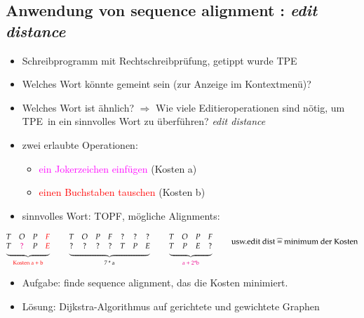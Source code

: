     \subsection*{Anwendung von sequence alignment : \emph{edit distance}}
    \begin{itemize}
        \item Schreibprogramm mit Rechtschreibprüfung, getippt wurde \glqq TPE\grqq
        \item Welches Wort könnte gemeint sein (zur Anzeige im Kontextmenü)?
        \item Welches Wort ist ähnlich? $\Rightarrow$ Wie viele Editieroperationen sind nötig, um \glqq TPE\grqq \ in ein sinnvolles Wort zu überführen? \emph{edit distance}
        \item zwei erlaubte Operationen:
        \begin{itemize}
            \item \textcolor{magenta}{ein Jokerzeichen einfügen} (Kosten a)
            \item \textcolor{red}{einen Buchstaben tauschen} (Kosten b)
        \end{itemize}
        \item sinnvolles Wort: \glqq TOPF\grqq , mögliche Alignments:
    \end{itemize}
    \[ \underbrace{\begin{matrix}
    T & O & P & \textcolor{red}{F} \\
    T & \textcolor{magenta}{?} & P & \textcolor{red}{E}
    \end{matrix}}_{\text{\textcolor{red}{Kosten a + b}}}\hspace*{0.8cm}  \underbrace{\begin{matrix} T & O & P & F & ? & ? & ? \\ ? & ? & ? & ? & T & P & E \end{matrix}}_{\text{7 * a}} \hspace*{0.8cm} \underbrace{\begin{matrix} T & O & P & F \\ T & P & E & ? \end{matrix}}_{\text{\textcolor{magenta}{a + 2*b}}} \hspace*{0.8cm} \text{usw.\\ edit dist } \widehat{=} \text{ minimum der Kosten}\]

    \begin{itemize}[label={}]
        \item Aufgabe: finde sequence alignment, das die Kosten minimiert.
        \item Lösung: Dijkstra-Algorithmus auf gerichtete und gewichtete Graphen
    \end{itemize}

